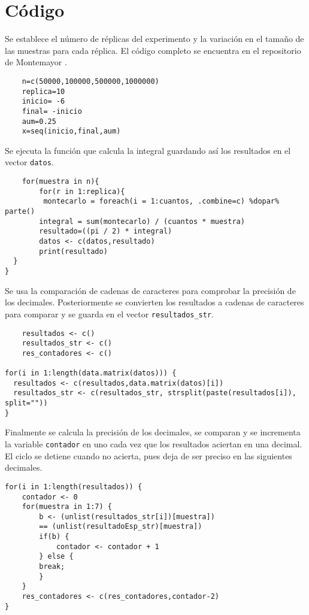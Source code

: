 \documentclass[12pt]{amsart}
\begin{document}
\section{Código}
Se establece el número de réplicas del experimento y la variación en el tamaño de las muestras para cada réplica. El código completo se encuentra en el repositorio de Montemayor \cite{mtyor}.
\renewcommand{\listingscaption}{Código}
\begin{listing}[H]
  \begin{verbatim}
    n=c(50000,100000,500000,1000000)
    replica=10
    inicio= -6
    final= -inicio
    aum=0.25
    x=seq(inicio,final,aum)
  \end{verbatim}
  \label{codigo1}
\end{listing}
Se ejecuta la función que calcula la integral guardando así los resultados en el vector \texttt{datos}.
\renewcommand{\listingscaption}{Código}
\begin{listing}[H]
  \begin{verbatim}
    for(muestra in n){
        for(r in 1:replica){
         montecarlo = foreach(i = 1:cuantos, .combine=c) %dopar% parte()
        integral = sum(montecarlo) / (cuantos * muestra)
        resultado=((pi / 2) * integral)
        datos <- c(datos,resultado)
        print(resultado)
  }
}
  \end{verbatim}
  \label{codigo2}
\end{listing}
Se usa la comparación de cadenas de caracteres para comprobar la precisión de los decimales. Posteriormente se convierten los resultados a cadenas de caracteres para comparar y se guarda en el vector \texttt{resultados\_str}.
\renewcommand{\listingscaption}{Código}
\begin{listing}[H]
  \begin{verbatim}
    resultados <- c()
    resultados_str <- c()
    res_contadores <- c()

for(i in 1:length(data.matrix(datos))) {
  resultados <- c(resultados,data.matrix(datos)[i])
  resultados_str <- c(resultados_str, strsplit(paste(resultados[i]), split=""))
}
  \end{verbatim}
  \label{codigo2}
\end{listing}
\newpage
Finalmente se calcula la precisión de los decimales, se comparan y se incrementa la variable \texttt{contador} en uno cada vez que los resultados aciertan en una decimal. El ciclo se detiene cuando no acierta, pues deja de ser preciso en las siguientes decimales.
\renewcommand{\listingscaption}{Código}
\begin{listing}[H]
  \begin{verbatim}
for(i in 1:length(resultados)) {
    contador <- 0
    for(muestra in 1:7) {
        b <- (unlist(resultados_str[i])[muestra])
        == (unlist(resultadoEsp_str)[muestra])
        if(b) {
            contador <- contador + 1
        } else {
        break;
        }
    }
    res_contadores <- c(res_contadores,contador-2)
}
  \end{verbatim}
  \label{codigo2}
\end{listing}
\end{document}
